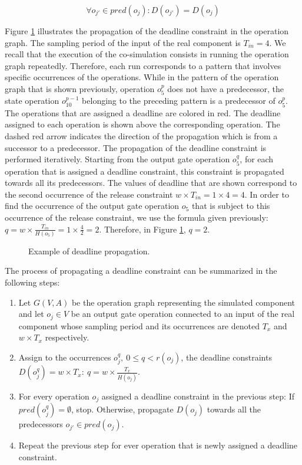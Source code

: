 \begin{equation}
\forall o_{j'} \in pred(o_j): D(o_{j'}) = D(o_j)
\label{eq:release}
\end{equation}

Figure \ref{fig:dpropagation} illustrates the propagation of the deadline constraint in the operation graph. The sampling period of the input of the real component is $T_{in} = 4$. We recall that the execution of the co-simulation consists in running the operation graph repeatedly. Therefore, each run corresponds to a pattern that involves specific occurrences of the operations. While in the pattern of the operation graph that is shown previously, operation $o_5^p$ does not have a predecessor, the state operation $o_{10}^{p-1}$ belonging to the preceding pattern is a predecessor of $o_5^{p}$. The operations that are assigned a deadline are colored in red. The deadline assigned to each operation is shown above the corresponding operation. The dashed red arrow indicates the direction of the propagation which is from a successor to a predecessor. The propagation of the deadline constraint is performed iteratively. Starting from the output gate operation $o_5^q$, for each operation that is assigned a deadline constraint, this constraint is propagated towards all its predecessors. The values of deadline that are shown correspond to the second occurrence of the release constraint $w \times T_{in} = 1 \times 4 = 4$. In order to find the occurrence of the output gate operation $o_5$ that is subject to this occurrence of the release constraint, we use the formula given previously: $q = w \times \frac{T_{in}}{H(o_5)} = 1 \times \frac{4}{2} = 2$. Therefore, in Figure \ref{fig:dpropagation}, $q = 2$.

\begin{figure}[phbt]
\centering

\caption{Example of deadline propagation.}
\label{fig:dpropagation}
\end{figure}

The process of propagating a deadline constraint can be summarized in the following steps:

\begin{enumerate}
\item Let $G(V,A)$ be the operation graph representing the simulated component and let $o_j \in  V$ be an output gate operation connected to an input of the real component whose sampling period and its occurrences are denoted $T_x$ and $w \times T_x$ respectively.
\item Assign to the occurrences $o_j^q,\ 0 \leq q < r(o_j)$, the deadline constraints $D(o_j^q) = w \times T_x:\ q = w \times \frac{T_x}{H(o_j)}$.
\item For every operation $o_j$ assigned a deadline constraint in the previous step: If $pred(o_j^q) = \emptyset$, stop. Otherwise, propagate $D(o_j)$ towards all the predecessors $o_{j'} \in pred(o_j)$.
\item Repeat the previous step for ever operation that is newly assigned a deadline constraint.
\end{enumerate}


